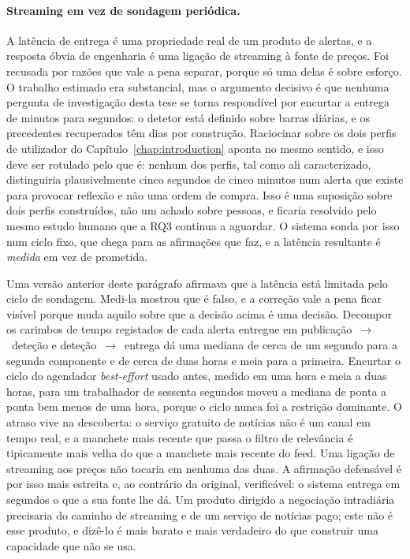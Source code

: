 \paragraph{Streaming em vez de sondagem periódica.} A latência de entrega é uma propriedade real de um
produto de alertas, e a resposta óbvia de engenharia é uma ligação de streaming à fonte de preços. Foi
recusada por razões que vale a pena separar, porque só uma delas é sobre esforço. O trabalho estimado
era substancial, mas o argumento decisivo é que nenhuma pergunta de investigação desta tese se torna
respondível por encurtar a entrega de minutos para segundos: o detetor está definido sobre barras
diárias, e os precedentes recuperados têm dias por construção. Raciocinar sobre os dois perfis de
utilizador do Capítulo~\ref{chap:introduction} aponta no mesmo sentido, e isso deve ser rotulado pelo que
é: nenhum dos perfis, tal como ali caracterizado, distinguiria plausivelmente cinco segundos de cinco
minutos num alerta que existe para provocar reflexão e não uma ordem de compra. Isso é uma suposição
sobre dois perfis construídos, não um achado sobre pessoas, e ficaria resolvido pelo mesmo estudo humano
que a RQ3 continua a aguardar. O sistema sonda por isso num ciclo fixo, que chega para as afirmações que
faz, e a latência resultante é \emph{medida} em vez de prometida.

Uma versão anterior deste parágrafo afirmava que a latência está limitada pelo ciclo de sondagem.
Medi-la mostrou que é falso, e a correção vale a pena ficar visível porque muda aquilo sobre que a
decisão acima é uma decisão. Decompor os carimbos de tempo registados de cada alerta entregue em
publicação~$\rightarrow$~deteção e deteção~$\rightarrow$~entrega dá uma mediana de cerca de um segundo
para a segunda componente e de cerca de duas horas e meia para a primeira. Encurtar o ciclo do
agendador \emph{best-effort} usado antes, medido em uma hora e meia a duas horas, para um trabalhador
de sessenta segundos moveu a mediana de ponta a ponta bem menos de uma hora, porque o ciclo nunca foi
a restrição dominante. O atraso vive na descoberta: o serviço gratuito de notícias não é um canal em
tempo real, e a manchete mais recente que passa o filtro de relevância é tipicamente mais velha do que
a manchete mais recente do feed. Uma ligação de streaming aos preços não tocaria em nenhuma das duas. A
afirmação defensável é por isso mais estreita e, ao contrário da original, verificável: o sistema
entrega em segundos o que a sua fonte lhe dá. Um produto dirigido a negociação intradiária precisaria
do caminho de streaming e de um serviço de notícias pago; este não é esse produto, e dizê-lo é mais
barato e mais verdadeiro do que construir uma capacidade que não se usa.


